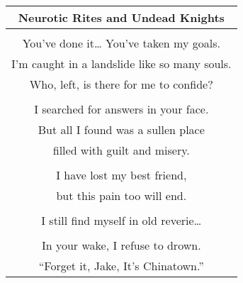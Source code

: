 \documentclass{article}
\begin{document}
\begin{center}
\begin{tabular}{c}
\textbf{Neurotic Rites and Undead Knights} \\ \hline
\\
You've done it\ldots{} You've taken my goals. \\
I'm caught in a landslide like so many souls. \\
Who, left, is there for me to confide? \\
\\
I searched for answers in your face. \\
But all I found was a sullen place \\
filled with guilt and misery. \\
\\
I have lost my best friend, \\
but this pain too will end. \\
\\
I still find myself in old reverie\ldots \\
\\
In your wake, I refuse to drown. \\
``Forget it, Jake, It's Chinatown.'' \\
\end{tabular}
\end{center}
\end{document}
